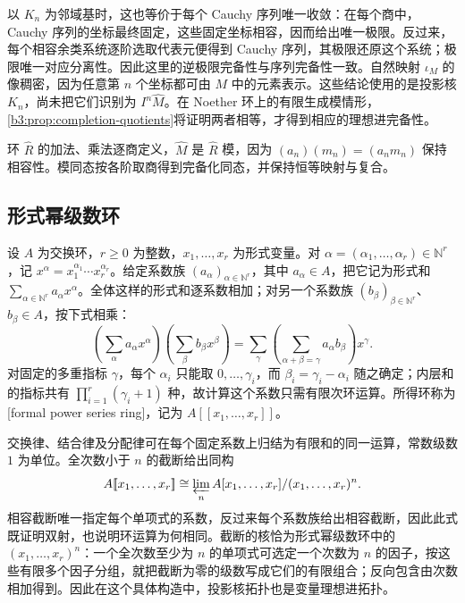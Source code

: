 以 \(K_n\) 为邻域基时，这也等价于每个 Cauchy 序列唯一收敛：在每个商中，Cauchy 序列的坐标最终固定，这些固定坐标相容，因而给出唯一极限。反过来，每个相容余类系统逐阶选取代表元便得到 Cauchy 序列，其极限还原这个系统；极限唯一对应分离性。因此这里的逆极限完备性与序列完备性一致。自然映射 \(\iota_M\) 的像稠密，因为任意第 \(n\) 个坐标都可由 \(M\) 中的元素表示。这些结论使用的是投影核 \(K_n\)，尚未把它们识别为 \(I^n\widehat M\)。在 Noether 环上的有限生成模情形，\cref{b3:prop:completion-quotients}将证明两者相等，才得到相应的理想进完备性。

\ProseParagraphBreak
环 \(\widehat R\) 的加法、乘法逐商定义，\(\widehat M\) 是 \(\widehat R\) 模，因为 \((a_n)(m_n)=(a_nm_n)\) 保持相容性。模同态按各阶取商得到完备化同态，并保持恒等映射与复合。

\subsection{形式幂级数环}
\label{b3:subsec:1303:02}

\begin{definition}\label{b3:def:formal-power-series}
	设 \(A\) 为交换环，\(r\ge0\) 为整数，\(x_1,\ldots,x_r\) 为形式变量。对 \(\alpha=(\alpha_1,\ldots,\alpha_r)\in\mathbb N^r\)，记 \(x^\alpha=x_1^{\alpha_1}\cdots x_r^{\alpha_r}\)。给定系数族 \((a_\alpha)_{\alpha\in\mathbb N^r}\)，其中 \(a_\alpha\in A\)，把它记为形式和 \(\sum_{\alpha\in\mathbb N^r}a_\alpha x^\alpha\)。全体这样的形式和逐系数相加；对另一个系数族 \((b_\beta)_{\beta\in\mathbb N^r}\)、\(b_\beta\in A\)，按下式相乘：
	\[
		\left(\sum_\alpha a_\alpha x^\alpha\right) \left(\sum_\beta b_\beta x^\beta\right) =\sum_\gamma\left(\sum_{\alpha+\beta=\gamma}a_\alpha b_\beta\right)x^\gamma.
	\]
	对固定的多重指标 \(\gamma\)，每个 \(\alpha_i\) 只能取 \(0,\ldots,\gamma_i\)，而 \(\beta_i=\gamma_i-\alpha_i\) 随之确定；内层和的指标共有 \(\prod_{i=1}^r(\gamma_i+1)\) 种，故计算这个系数只需有限次环运算。所得环称为[formal power series ring]，记为 \(A[\![x_1,\ldots,x_r]\!]\)。
\end{definition}

交换律、结合律及分配律可在每个固定系数上归结为有限和的同一运算，常数级数 \(1\) 为单位。全次数小于 \(n\) 的截断给出同构
\begin{equation}\label{b3:eq:power-series-limit}
	A[\![x_1,\ldots,x_r]\!]\cong \varprojlim_n A[x_1,\ldots,x_r]/(x_1,\ldots,x_r)^n.
\end{equation}
相容截断唯一指定每个单项式的系数，反过来每个系数族给出相容截断，因此此式既证明双射，也说明环运算为何相同。截断的核恰为形式幂级数环中的 \((x_1,\ldots,x_r)^n\)：一个全次数至少为 \(n\) 的单项式可选定一个次数为 \(n\) 的因子，按这些有限多个因子分组，就把截断为零的级数写成它们的有限组合；反向包含由次数相加得到。因此在这个具体构造中，投影核拓扑也是变量理想进拓扑。

